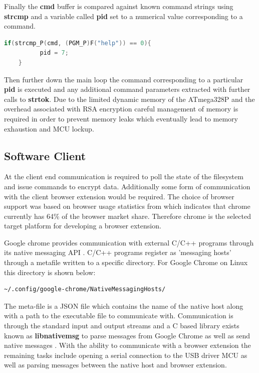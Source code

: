 Finally the \textbf{cmd} buffer is compared against known command strings using \textbf{strcmp} and a variable called \textbf{pid} set to a numerical value corresponding to a command.

\begin{lstlisting}[language=C]
 if(strcmp_P(cmd, (PGM_P)F("help")) == 0){
          pid = 7;
    }
\end{lstlisting}

Then further down the main loop the command corresponding to a particular \textbf{pid} is executed and any additional command parameters extracted with further calls to \textbf{strtok}. Due to the limited dynamic memory of the ATmega328P and the overhead associated with RSA encryption careful management of memory is required in order to prevent memory leaks which eventually lead to memory exhaustion and MCU lockup.


\subsection{Software Client}
At the client end communication is required to poll the state of the filesystem and issue commands to encrypt data. Additionally some form of communication with the client browser extension would be required. The choice of browser support was based on browser usage statistics from \cite{browser_stats} which indicates that chrome currently has 64\% of the browser market share. Therefore chrome is the selected target platform for developing a browser extension.

Google chrome provides communication with external C/C++ programs through its native messaging API \cite{native_messaging}. C/C++ programs register as 'messaging hosts' through a metafile written to a specific directory. For Google Chrome on Linux this directory is shown below: 

\begin{lstlisting}[language=bash, frame=none]
~/.config/google-chrome/NativeMessagingHosts/
\end{lstlisting}

The meta-file is a JSON file which contains the name of the native host along with a path to the executable file to communicate with. Communication is through the standard input and output streams and a C based library exists known as \textbf{libnativemsg} to parse messages from Google Chrome as well as send native messages \cite{lib_native}. With the ability to communicate with a browser extension the remaining tasks include opening a serial connection to the USB driver MCU as well as parsing messages between the native host and browser extension. 


